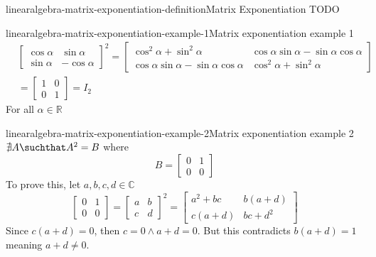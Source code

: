 \documentclass[preview]{standalone}
\begin{document}
\begin{snippetdefinition}{linearalgebra-matrix-exponentiation-definition}{Matrix Exponentiation}
    TODO
\end{snippetdefinition}

\begin{snippetexample}{linearalgebra-matrix-exponentiation-example-1}{Matrix exponentiation example 1}
    \begin{align*}
        & {\begin{bmatrix}
            \cos\alpha & \sin\alpha \\
            \sin\alpha & -\cos\alpha
        \end{bmatrix}}^2
        = \begin{bmatrix}
            \cos^2\alpha + \sin^2\alpha & \cos\alpha\sin\alpha - \sin\alpha\cos\alpha \\
            \cos\alpha\sin\alpha - \sin\alpha\cos\alpha & \cos^2\alpha + \sin^2\alpha
        \end{bmatrix}
        \\
        &= \begin{bmatrix}
            1 & 0 \\
            0 & 1
        \end{bmatrix} = I_2
    \end{align*}
    For all \(\alpha \in \mathbb{R}\)
\end{snippetexample}

\begin{snippetexample}{linearalgebra-matrix-exponentiation-example-2}{Matrix exponentiation example 2}
    \(\nexists A \suchthat A^2 = B\) where
    \[
        B = \begin{bmatrix}
            0 & 1 \\
            0 & 0
        \end{bmatrix}
    \]
    To prove this, let \(a,b,c,d \in \mathbb{C}\)
    \[
        \begin{bmatrix}
            0 & 1 \\
            0 & 0
        \end{bmatrix}
        =
        {\begin{bmatrix}
            a & b \\
            c & d
        \end{bmatrix}}^2
        =
        \begin{bmatrix}
            a^2+bc & b(a+d) \\
            c(a+d) & bc+d^2
        \end{bmatrix}
    \]
    Since \(c(a+d)=0\), then \(c=0 \land a+d=0\).
    But this contradicts \(b(a+d)=1\) meaning \(a+d \neq 0\).
\end{snippetexample}
\end{document}
